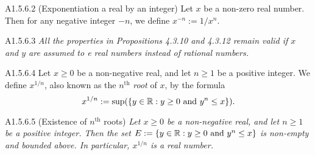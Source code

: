 \begin{definition}{A1.5.6.2}
    (Exponentiation a real by an integer) Let $x$ be a non-zero real number.
    Then for any negative integer $-n$, we define $x^{-n} := 1/x^n$.
\end{definition}

\begin{proposition}{A1.5.6.3}
    \emph{All the properties in Propositions 4.3.10 and 4.3.12 remain valid if
    $x$ and $y$ are assumed to e real numbers instead of rational numbers.}
\end{proposition}

\begin{definition}{A1.5.6.4}
    Let $x \geq 0$ be a non-negative real, and let $n \geq 1$ be a positive integer.
    We define $x^{1/n}$, also known as the $n^{\text{th}}$ \emph{root} of $x$,
    by the formula
    \begin{equation*}
        x^{1/n} := \text{sup}{(\{y \in \mathbb{R}: y \geq 0 \text{ and } y^n \leq x\})}.
    \end{equation*}
\end{definition}

\begin{lemma}{A1.5.6.5}
    (Existence of $n^{\text{th}}$ roots) \emph{Let $x \geq 0$ be a non-negative
    real, and let $n \geq 1$ be a positive integer. Then the set $E := \{y \in \mathbb{R}: y \geq 0 \text{ and } y^n \leq x\}$
    is non-empty and bounded above. In particular, $x^{1/n}$ is a real number.}
\end{lemma}


